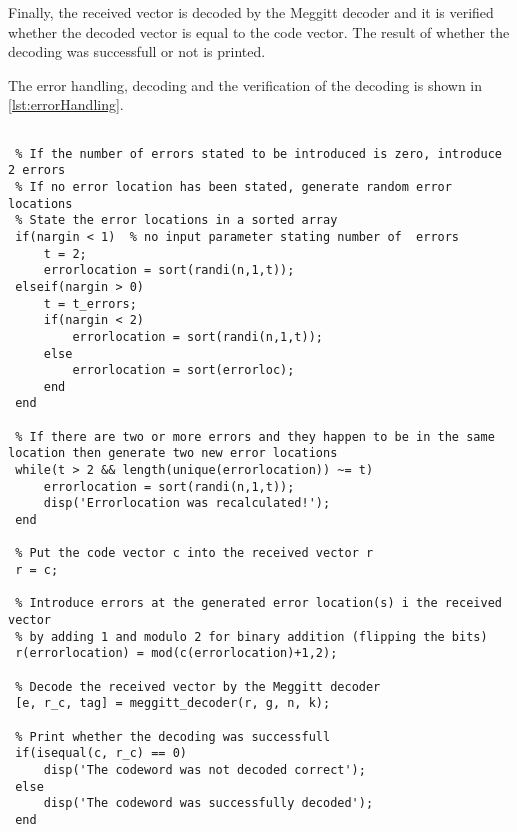\documentclass[Main]{subfiles}
\begin{document}
Finally, the received vector is decoded by the Meggitt decoder and it is verified whether the decoded vector is equal to the code vector. The result of whether the decoding was successfull or not is printed.

The error handling, decoding and the verification of the decoding is shown in \codeTitle \ref{lst:errorHandling}.

\begin{lstlisting}[caption=Error Handling and Decoding, style=Code-Matlab, label=lst:errorHandling]
 % Transmit the code vector through an artificial communication channel, i.e. introduce at least one error to the code vector:

 % If the number of errors stated to be introduced is zero, introduce 2 errors
 % If no error location has been stated, generate random error locations
 % State the error locations in a sorted array
 if(nargin < 1)  % no input parameter stating number of  errors
     t = 2;
     errorlocation = sort(randi(n,1,t));
 elseif(nargin > 0)
     t = t_errors;
     if(nargin < 2)
         errorlocation = sort(randi(n,1,t));
     else
         errorlocation = sort(errorloc);
     end
 end

 % If there are two or more errors and they happen to be in the same location then generate two new error locations
 while(t > 2 && length(unique(errorlocation)) ~= t)
     errorlocation = sort(randi(n,1,t));
     disp('Errorlocation was recalculated!');
 end

 % Put the code vector c into the received vector r
 r = c;

 % Introduce errors at the generated error location(s) i the received vector
 % by adding 1 and modulo 2 for binary addition (flipping the bits)
 r(errorlocation) = mod(c(errorlocation)+1,2);

 % Decode the received vector by the Meggitt decoder
 [e, r_c, tag] = meggitt_decoder(r, g, n, k);

 % Print whether the decoding was successfull 
 if(isequal(c, r_c) == 0)
     disp('The codeword was not decoded correct');
 else
     disp('The codeword was successfully decoded');
 end
\end{lstlisting}
\end{document}
